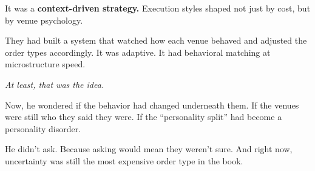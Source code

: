 \medskip

It was a \textbf{context-driven strategy.}
Execution styles shaped not just by cost, but by venue psychology.

They had built a system that watched how each venue behaved
and adjusted the order types accordingly.
It was adaptive. It had behavioral matching at microstructure speed.

\textit{At least, that was the idea.}

Now, he wondered if the behavior had changed underneath them.
If the venues were still who they said they were.
If the ``personality split'' had become a personality disorder.

He didn’t ask.
Because asking would mean they weren’t sure.
And right now, uncertainty was still the most expensive order type in the book.

  


